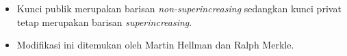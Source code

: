 \documentclass{article}
\begin{document}

\begin{itemize}
    \item Kunci publik merupakan barisan \textit{non-superincreasing} sedangkan kunci privat tetap merupakan barisan \textit{superincreasing}.
    \item Modifikasi ini ditemukan oleh Martin Hellman dan Ralph Merkle.
\end{itemize}
\end{document}
